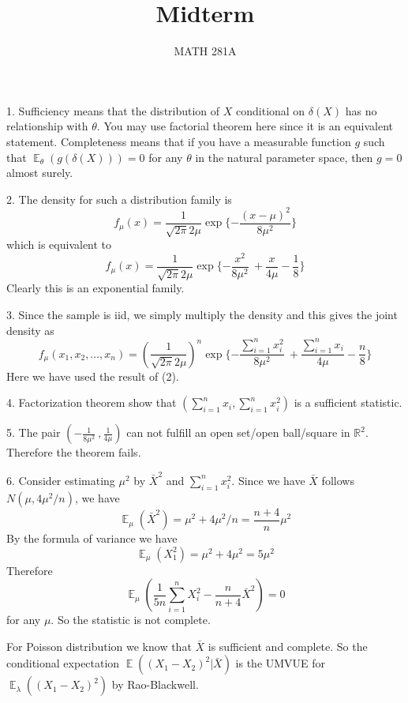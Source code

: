 \documentclass[12pt]{article}
\newenvironment{problem}[2][Problem]{\begin{trivlist}
\item[\hskip \labelsep {\bfseries #1}\hskip \labelsep {\bfseries #2.}]}{\end{trivlist}}
\newcommand{\E}{\operatorname{\mathbb{E}}}
\begin{document}
\title{Midterm}%
\author{MATH 281A} %
\maketitle
\begin{problem}{1}
\end{problem}

1. Sufficiency means that the distribution of $X$ conditional on $\delta(X)$ has no relationship with $\theta$. You may use factorial theorem here since it is an equivalent statement. Completeness means that if you have a measurable function $g$ such that $\E_\theta (g(\delta(X))) = 0$ for any $\theta$ in the natural parameter space, then $g = 0$ almost surely.

2. The density for such a distribution family is
$$
f_\mu(x) = \frac{1}{\sqrt{2\pi} 2\mu} \exp\{-\frac{(x - \mu)^2}{8\mu^2}\}
$$
which is equivalent to 
$$
f_\mu(x) = \frac{1}{\sqrt{2\pi} 2\mu} \exp\{-\frac{x^2}{8\mu^2}\ +\frac{x}{4\mu} - \frac{1}{8} \}
$$
Clearly this is an exponential family.

3. Since the sample is iid, we simply multiply the density and this gives the joint density as
$$
f_\mu(x_1,x_2,\ldots,x_n) = (\frac{1}{\sqrt{2\pi} 2\mu})^n \exp\{-\frac{\sum_{i=1}^n x_i^2}{8\mu^2}\ +\frac{\sum_{i=1}^n x_i}{4\mu} - \frac{n}{8} \}
$$
Here we have used the result of (2).

4. Factorization theorem show that $(\sum_{i=1}^n x_i,\sum_{i=1}^n x_i^2)$ is a sufficient statistic.

5. The pair $(-\frac{1}{8\mu^2}\ ,\frac{1}{4\mu})$ can not fulfill an open set/open ball/square in $\mathbb{R}^2$. Therefore the theorem fails.

6. Consider estimating $\mu^2$ by $\bar{X}^2$ and $\sum_{i=1}^n x_i^2$. Since we have $\bar{X}$ follows $N(\mu, 4\mu^2/n)$, we have
$$
\E_\mu(\bar{X}^2) = \mu^2 + 4\mu^2/n = \frac{n+4}{n} \mu^2
$$
By the formula of variance we have
$$
\E_\mu(X_1^2) = \mu^2 + 4\mu^2 = 5 \mu^2
$$
Therefore 
$$
\E_\mu (\frac{1}{5n}\sum_{i=1}^n X_i^2 - \frac{n}{n+4}\bar{X}^2) = 0
$$
for any $\mu$. So the statistic is not complete.

\begin{problem}{2}
\end{problem}

For Poisson distribution we know that $\bar{X}$ is sufficient and complete. So the conditional expectation $\E ( (X_1 - X_2)^2 | \bar{X})$ is the UMVUE for $\E_\lambda ( (X_1 - X_2)^2)$ by Rao-Blackwell.
\end{document}
